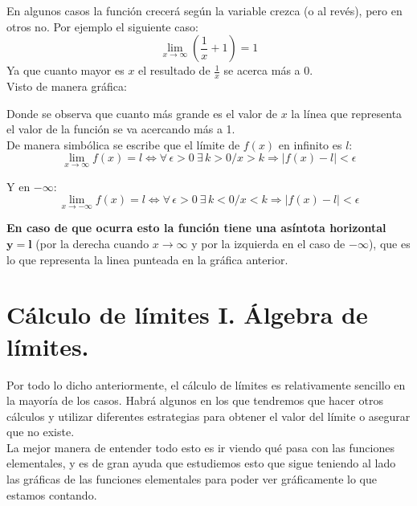 \documentclass[a4paper,11pt,answers]{exam}
\begin{document}
En algunos casos la función crecerá según la variable crezca (o al revés), pero en otros no. Por ejemplo el siguiente caso:
\[\lim_{x \to \infty} \left(\frac{1}{x} + 1\right) = 1\]
Ya que cuanto mayor es $x$ el resultado de $\frac{1}{x}$ se acerca más a 0.\\
Visto de manera gráfica:
\begin{center}
\end{center}
Donde se observa que cuanto más grande es el valor de $x$ la línea que representa el valor de la función se va acercando más a 1.\\

De manera simbólica se escribe que el límite de $f(x)$ en infinito es $l$:
\[\lim_{x \to \infty} f(x) = l \Leftrightarrow \forall\,\epsilon>0\ \exists\,k > 0 / x>k \Rightarrow |f(x) - l| < \epsilon\]

Y en $-\infty$:
\[\lim_{x \to -\infty} f(x) = l \Leftrightarrow \forall\,\epsilon>0\ \exists\,k < 0 / x<k \Rightarrow |f(x) - l| < \epsilon\]

\textbf{En caso de que ocurra esto la función tiene una asíntota horizontal $\boldsymbol{y = l}$} (por la derecha cuando $x \to \infty$ y por la izquierda en el caso de $-\infty$), que es lo que representa la linea punteada en la gráfica anterior.
\section{Cálculo de límites I. Álgebra de límites.}
Por todo lo dicho anteriormente, el cálculo de límites es relativamente sencillo en la mayoría de los casos. Habrá algunos en los que tendremos que hacer otros cálculos y utilizar diferentes estrategias para obtener el valor del límite o asegurar que no existe.\\

La mejor manera de entender todo esto es ir viendo qué pasa con las funciones elementales, y es de gran ayuda que estudiemos esto que sigue teniendo al lado las gráficas de las funciones elementales para poder ver gráficamente lo que estamos contando.
\end{document}
